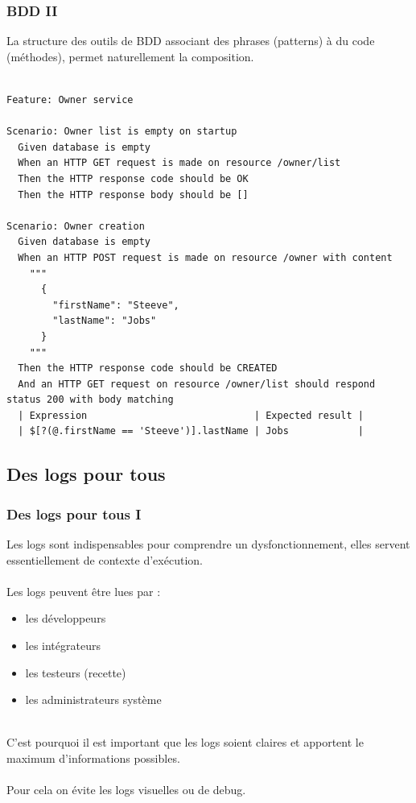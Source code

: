 \begin{frame}[fragile]
	\frametitle{BDD II}
    La structure des outils de BDD associant des phrases (patterns) \`{a} du code (m\'{e}thodes), permet naturellement la composition.
    \\~\\
    \begin{lstlisting}[basicstyle=\tiny]
Feature: Owner service

Scenario: Owner list is empty on startup
  Given database is empty
  When an HTTP GET request is made on resource /owner/list
  Then the HTTP response code should be OK
  Then the HTTP response body should be []

Scenario: Owner creation
  Given database is empty
  When an HTTP POST request is made on resource /owner with content
    """
      {
      	"firstName": "Steeve",
      	"lastName": "Jobs"
      }
    """
  Then the HTTP response code should be CREATED
  And an HTTP GET request on resource /owner/list should respond status 200 with body matching
  | Expression                             | Expected result |
  | $[?(@.firstName == 'Steeve')].lastName | Jobs            |
	\end{lstlisting}
\end{frame}

\subsection{Des logs pour tous}
\begin{frame}
	\frametitle{Des logs pour tous I}

    Les logs sont indispensables pour comprendre un dysfonctionnement, elles servent essentiellement de contexte d'ex\'{e}cution.
    \\~\\
    Les logs peuvent \^{e}tre lues par :
    \begin{itemize}
    	\item les d\'{e}veloppeurs
        \item les int\'{e}grateurs
        \item les testeurs (recette)
        \item les administrateurs syst\`{e}me
    \end{itemize}
    ~\\
    C'est pourquoi il est important que les logs soient claires et apportent le maximum d'informations possibles.
    \\~\\
    Pour cela on \'{e}vite les logs visuelles ou de debug.
\end{frame}

